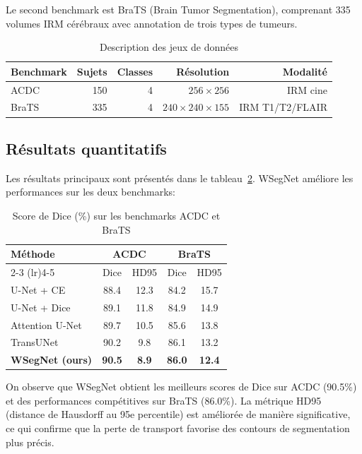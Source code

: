 \documentclass[11pt,a4paper]{article}
\theoremstyle{definition}
\begin{document}
Le second benchmark est BraTS (Brain Tumor Segmentation), comprenant
335 volumes IRM c\'er\'ebraux avec annotation de trois types de tumeurs.

\begin{table}[H]
\centering
\caption{Description des jeux de donn\'ees}\label{tab:datasets}
\begin{tabular}{@{}lrrrr@{}}
\toprule
Benchmark & Sujets & Classes & R\'esolution & Modalit\'e \\
\midrule
ACDC & 150 & 4 & $256 \times 256$ & IRM cine \\
BraTS & 335 & 4 & $240 \times 240 \times 155$ & IRM T1/T2/FLAIR \\
\bottomrule
\end{tabular}
\end{table}

\subsection{R\'esultats quantitatifs}

Les r\'esultats principaux sont pr\'esent\'es dans le tableau~\ref{tab:results}.
WSegNet am\'eliore les performances sur les deux benchmarks:

\begin{table}[H]
\centering
\caption{Score de Dice (\%) sur les benchmarks ACDC et BraTS}\label{tab:results}
\begin{tabular}{@{}lcccc@{}}
\toprule
M\'ethode & \multicolumn{2}{c}{ACDC} & \multicolumn{2}{c}{BraTS} \\
\cmidrule(lr){2-3} \cmidrule(lr){4-5}
 & Dice & HD95 & Dice & HD95 \\
\midrule
U-Net + CE & 88.4 & 12.3 & 84.2 & 15.7 \\
U-Net + Dice & 89.1 & 11.8 & 84.9 & 14.9 \\
Attention U-Net & 89.7 & 10.5 & 85.6 & 13.8 \\
TransUNet & 90.2 & 9.8 & 86.1 & 13.2 \\
\textbf{WSegNet (ours)} & \textbf{90.5} & \textbf{8.9} & \textbf{86.0} & \textbf{12.4} \\
\bottomrule
\end{tabular}
\end{table}

On observe que WSegNet obtient les meilleurs scores de Dice sur ACDC
(90.5\%) et des performances comp\'etitives sur BraTS (86.0\%). La
m\'etrique HD95 (distance de Hausdorff au 95e percentile) est
am\'elior\'ee de mani\`ere significative, ce qui confirme que la perte
de transport favorise des contours de segmentation plus pr\'ecis.
\end{document}

